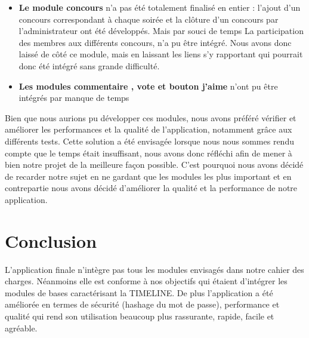 \documentclass[11pt]{article} %
\begin{document}
\begin{itemize}
\item \textbf{Le module concours} n’a pas été totalement finalisé en entier : l’ajout d’un concours correspondant à chaque soirée et la clôture d’un concours par l’administrateur ont été développés. Mais par souci de temps  La participation des membres aux différents concours,  n’a pu être intégré. Nous avons donc laissé de côté ce module, mais en laissant les liens s'y rapportant qui pourrait donc été intégré sans grande 
difficulté.  

\item \textbf{Les modules commentaire , vote et bouton j’aime} n’ont pu être  intégrés par manque de temps
\end{itemize}

Bien que nous aurions pu développer ces modules, nous avons préféré vérifier et améliorer les performances et la qualité de l’application, notamment grâce aux différents tests. Cette solution a été envisagée lorsque nous nous sommes rendu compte que le temps était insuffisant, nous avons donc réfléchi afin de mener à bien notre projet de la meilleure façon possible. C'est pourquoi nous avons décidé de recarder notre sujet en ne gardant que les modules les plus important et en contrepartie nous avons décidé d'améliorer la qualité et la performance de notre application.\\

\section{Conclusion}
L'application finale n'intègre pas tous les modules envisagés dans notre cahier des charges. Néanmoins elle est conforme à nos objectifs qui étaient d'intégrer les modules de bases caractérisant la TIMELINE. De plus l'application a été améliorée en termes de sécurité (hashage du mot de passe), performance et qualité qui rend son utilisation beaucoup plus rassurante, rapide, facile et agréable. 
\end{document}
